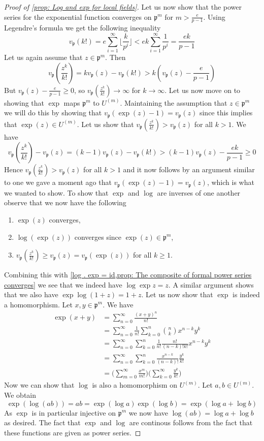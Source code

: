 \documentclass{article}
\newcommand{\mfrak}[1]{\mathfrak{#1}}
\newcommand{\vp}{{v_{\mfrak p}}}
\numberwithin{equation}{section}
\begin{document}
\begin{proof}[Proof of \cref{prop: Log and exp for local fields}]
    Let us now show that the power series for the exponential function converges on $\mfrak p^m$ for $m > \frac{e}{p-1}$. Using Legendre's formula we get the following inequality
    $$\vp(k!) = e\sum_{i=1}^\infty \lfloor \frac{k}{p^i} \rfloor < ek \sum_{i=1}^\infty \frac{1}{p^i} = \frac{ek}{p-1}$$
    Let us again assume that $z \in \mfrak p^m$. Then
    $$\vp(\frac{z^k}{k!}) = k\vp(z) - \vp(k!) > k(\vp(z) - \frac{e}{p-1})$$
    But $\vp(z) - \frac{e}{p-1} \geq 0$, so $\vp(\frac{z^k}{k!}) \to \infty$ for $k \to \infty$. Let us now move on to showing that $\exp$ maps $\mfrak p^m$ to $U^{(m)}$. Maintaining the assumption that $z \in \mfrak p^m$ we will do this by showing that $\vp(\exp(z) - 1) = \vp(z)$ since this implies that $\exp(z) \in U^{(m)}$. Let us show that $\vp(\frac{z^k}{k!}) > \vp(z)$ for all $k > 1$. We have
    $$\vp(\frac{z^k}{k!}) - \vp(z) = (k-1)\vp(z) - \vp(k!) > (k-1)\vp(z) - \frac{ek}{p-1} \geq 0$$
    Hence $\vp(\frac{z^k}{k!}) > \vp(z)$ for all $k > 1$ and it now follows by an argument similar to one we gave a moment ago that $\vp(\exp(z) - 1) = \vp(z)$, which is what we wanted to show. To show that $\exp$ and $\log$ are inverses of one another observe that we now have the following
    \begin{enumerate}
        \item $\exp(z)$ converges,
        \item $\log(\exp(z))$ converges since $\exp(z) \in \mfrak p^m$,
        \item $\vp(\frac{z^k}{k!}) \geq \vp(z) = \vp(\exp(z))$ for all $k \geq 1$.
    \end{enumerate}
    Combining this with \cref{log . exp = id,prop: The composite of formal power series converges} we see that we indeed have $\log \exp z = z$. A similar argument shows that we also have $\exp \log (1 + z) = 1 + z$. Let us now show that $\exp$ is indeed a homomorphism. Let $x,y \in \mfrak p^m$. We have
    \begin{align*}
        \exp (x + y) &= \sum_{n = 0}^\infty \frac{(x+y)^n}{n!} \\ 
        &= \sum_{n=0}^\infty \frac{1}{n!} \sum_{k = 0}^n \binom{n}{k} x^{n-k}y^k \\
        &= \sum_{n=0}^\infty \sum_{k = 0}^n \frac{1}{n!}\frac{n!}{(n-k)!k!}x^{n-k}y^k \\
        &= \sum_{n=0}^\infty \sum_{k = 0}^n \frac{x^{n-k}}{(n-k)!}\frac{y^k}{k!} \\
        &= \bigl(\sum_{m = 0}^\infty \frac{x^m}{m!} \bigr)\bigl(\sum_{k = 0}^\infty \frac{y^k}{k!} \bigr)
    \end{align*}
    Now we can show that $\log$ is also a homomorphism on $U^{(m)}$. Let $a,b \in U^{(m)}$. We obtain 
    $$\exp(\log(ab)) = ab = \exp(\log a) \exp(\log b) = \exp(\log a + \log b)$$
    As $\exp$ is in particular injective on $\mfrak p^{m}$ we now have $\log(ab) = \log a + \log b$ as desired. The fact that $\exp$ and $\log$ are continous follows from the fact that these functions are given as power series.
\end{proof}
\end{document}
